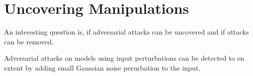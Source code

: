 \section{Uncovering Manipulations}
\label{sec:uncovering_manipulations}
An interesting question is, if adversarial attacks can be uncovered and if attacks can be removed. 

Adversarial attacks on models using input perturbations can be detected to en extent by adding small Gaussian noise perurbation to the input. 
